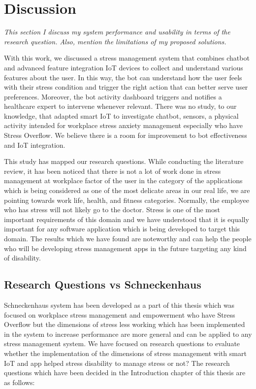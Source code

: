 \chapter{Discussion}
\textit{This section I discuss my system performance and usability in terms of the research question. Also, mention the limitations of my proposed solutions.}
\vspace{5mm}

With this work,  we discussed a  stress management system  that combines  chatbot and advanced feature integration IoT devices to collect and understand various features about the user. In this way, the  bot can  understand how  the user  feels with their stress condition and trigger the right action that can better serve user preferences. Moreover, the bot activity dashboard triggers and notifies a  healthcare expert to  intervene whenever relevant.
There  was no study, to  our knowledge,  that  adapted smart \acs{IoT} to investigate chatbot, sensors, a physical activity intended for workplace stress anxiety management especially who have Stress Overflow. We believe there is a  room for  improvement to bot effectiveness and  IoT integration.  

This study has mapped our research questions. While conducting the literature review, it has been noticed that there is not a lot of work done in stress management at workplace factor of the user in the category of the applications which is being considered as one of the most delicate areas in our real life, we are pointing towards work life, health, and fitness categories. Normally, the employee who has stress will not likely go to the doctor. Stress is one of the most important requirements of this domain and we have understood that it is equally important for any software application which is being developed to target this domain. The results which we have found are noteworthy and can help the people who will be developing stress management apps in the future targeting any kind of disability. 

\section{Research Questions vs Schneckenhaus}

Schneckenhaus system has been developed as a part of this thesis which was focused on workplace stress management and empowerment who have Stress Overflow but the dimensions of stress less working which has been implemented in the system to increase performance are more general and can be applied to any stress management system. We have focused on research questions to evaluate whether the implementation of the dimensions of stress management with smart IoT and app helped stress disability to manage stress or not? The research questions which have been decided in the Introduction chapter of this thesis are as follows: 

